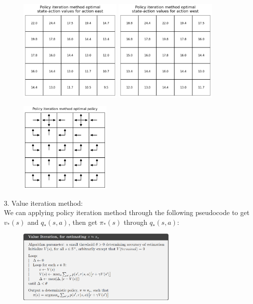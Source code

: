 \begin{homeworkProblem}
\begin{figure}[!htbp]
    \centering
    \includegraphics[width=0.45\textwidth]{./figure/p3_output/optimal/policy_iteration/Q_east.png}
    \includegraphics[width=0.45\textwidth]{./figure/p3_output/optimal/policy_iteration/Q_west.png}
    \vspace{-0.5cm}
\end{figure}
\begin{figure}[!htbp]
    \centering
    \includegraphics[width=0.4\textwidth]{./figure/p3_output/optimal/policy_iteration/policy.png}
\end{figure}

3. Value iteration method: \\
We can applying policy iteration method through the following pseudocode to get $v_*(s)$ and $q_*(s,a)$, then get $\pi_*(s)$ through $q_*(s,a)$:
\begin{figure}[!htbp]
    \centering
    \includegraphics[width=0.7\textwidth]{./figure/value_iteration_pseudocode}
\end{figure}


\end{homeworkProblem}
